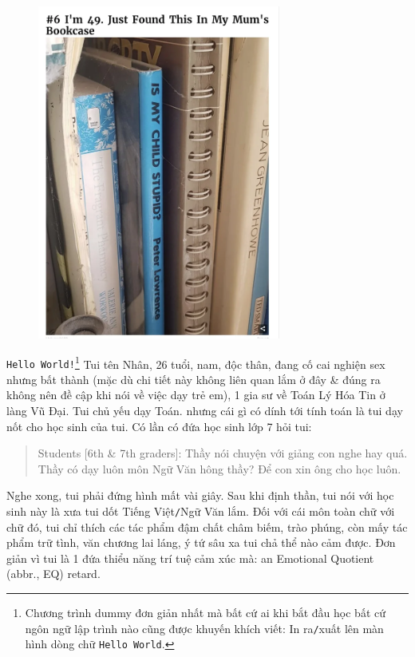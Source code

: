 \documentclass[12pt,twoside]{book}
\begin{document}
\begin{figure}[H]
	\centering
	\includegraphics[width = 8cm]{stupid_child}
\end{figure}
{\tt Hello World!}\footnote{Chương trình dummy đơn giản nhất mà bất cứ ai khi bắt đầu học bất cứ ngôn ngữ lập trình nào cũng được khuyến khích viết: In ra{\tt/}xuất lên màn hình dòng chữ {\tt Hello World}.} Tui tên {\sf Nhân}, 26 tuổi, nam, độc thân, đang cố cai nghiện sex nhưng bất thành (mặc dù chi tiết này không liên quan lắm ở đây \& đúng ra không nên đề cập khi nói về việc dạy trẻ em), 1 gia sư về Toán Lý Hóa Tin ở làng {\sf Vũ Đại}. Tui chủ yếu dạy Toán. nhưng cái gì có dính tới tính toán là tui dạy nốt cho học sinh của tui. Có lần có đứa học sinh lớp 7 hỏi tui:
\begin{quote}
	{\sf Students [6th \& 7th graders]}: Thầy nói chuyện với giảng con nghe hay quá. Thầy có dạy luôn môn Ngữ Văn hông thầy? Để con xin ông cho học luôn.
\end{quote}
Nghe xong, tui phải đứng hình mất vài giây. Sau khi định thần, tui nói với học sinh này là xưa tui dốt Tiếng Việt{\tt/}Ngữ Văn lắm. Đối với cái môn toàn chữ với chữ đó, tui chỉ thích các tác phẩm đậm chất châm biếm, trào phúng, còn mấy tác phẩm trữ tình, văn chương lai láng, ý tứ sâu xa tui chả thể nào cảm được. Đơn giản vì tui là 1 đứa thiểu năng trí tuệ cảm xúc mà: an Emotional Quotient (abbr., EQ) retard.
\end{document}
